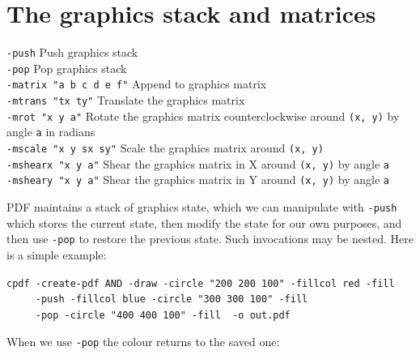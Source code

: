 \documentclass{book}
\begin{document}
\section{The graphics stack and matrices}
  {\small\begin{framed}
   \noindent\verb!-push! Push graphics stack\\
   \noindent\verb!-pop! Pop graphics stack\\
   \noindent\verb!-matrix "a b c d e f"! Append to graphics matrix\\
   \noindent\verb!-mtrans "tx ty"! Translate the graphics matrix\\
   \noindent\verb!-mrot "x y a"! Rotate the graphics matrix counterclockwise around \texttt{(x, y)} by angle \texttt{a} in radians\\
   \noindent\verb!-mscale "x y sx sy"! Scale the graphics matrix around \texttt{(x, y)}\\
   \noindent\verb!-mshearx "x y a"! Shear the graphics matrix in X around \texttt{(x, y)} by angle \texttt{a}\\
   \noindent\verb!-msheary "x y a"! Shear the graphics matrix in Y around \texttt{(x, y)} by angle \texttt{a}
  \end{framed}}

PDF maintains a stack of graphics state, which we can manipulate with \texttt{-push} which stores the current state, then modify the state for our own purposes, and then use \texttt{-pop} to restore the previous state. Such invocations may be nested. Here is a simple example:
 
\begin{framed}
 \noindent\small\verb?cpdf -create-pdf AND -draw -circle "200 200 100" -fillcol red -fill?\\
 \noindent\small\verb?     -push -fillcol blue -circle "300 300 100" -fill?\\
 \noindent\small\verb?     -pop -circle "400 400 100" -fill  -o out.pdf?
\end{framed}

\noindent When we use \texttt{-pop} the colour returns to the saved one:

\bigskip
{}
\bigskip
\end{document}
